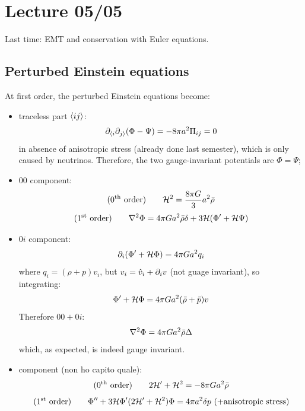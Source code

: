 \chapter{Lecture 05/05}

Last time: EMT and conservation with Euler equations.

\section{Perturbed Einstein equations}

At first order, the perturbed Einstein equations become:
\begin{itemize}
  \item traceless part $ \braket{ij} $:
    \begin{equation}
      \partial_{\langle i} \partial_{j \rangle} (\Phi - \Psi) = - 8 \pi a^2 \Pi_{ij} = 0
    \end{equation}
    in absence of anisotropic stress (already done last semester), which is only caused by neutrinos. Therefore, the two gauge-invariant potentials are $ \Phi = \Psi $;
  \item $ 00 $ component:
    \begin{equation}
      (\text{0$ ^\text{th} $ order})
      \qquad
      \mathcal{H}^2 = \frac{8\pi G}{3} a^2 \bar{\rho}
    \end{equation}
    \begin{equation}
      (\text{1$ ^\text{st} $ order})
      \qquad
      \nabla^2 \Phi = 4 \pi G a^2 \bar{\rho} \delta + 3 \mathcal{H} (\Phi' + \mathcal{H} \Psi)
    \end{equation}
  \item $ 0i $ component:
    \begin{equation*}
      \partial_i (\Phi' + \mathcal{H} \Phi) = 4 \pi G a^2 q_i
    \end{equation*}
    where $ q_i = (\rho + p) v_i $, but $ v_i = \hat{v}_i + \partial_i v $ (not guage invariant), so integrating:
    \begin{equation}
      \Phi' + \mathcal{H} \Phi = 4 \pi G a^2 (\bar{\rho} + \bar{p}) v
    \end{equation}
    Therefore $ 00 + 0i $:
    \begin{equation}
      \nabla^2 \Phi = 4 \pi G a^2 \bar{\rho} \Delta
    \end{equation}
    which, as expected, is indeed gauge invariant.
  \item component (non ho capito quale):
    \begin{equation}
      (\text{0$ ^\text{th} $ order})
      \qquad
      2 \mathcal{H}' + \mathcal{H}^2 = - 8 \pi G a^2 \bar{\rho}
    \end{equation}
    \begin{equation}
      (\text{1$ ^\text{st} $ order})
      \qquad
      \Phi'' + 3 \mathcal{H} \Phi' (2\mathcal{H}' + \mathcal{H}^2) \Phi = 4 \pi a^2 \delta p \ (+ \text{anisotropic stress})
    \end{equation}
\end{itemize}

